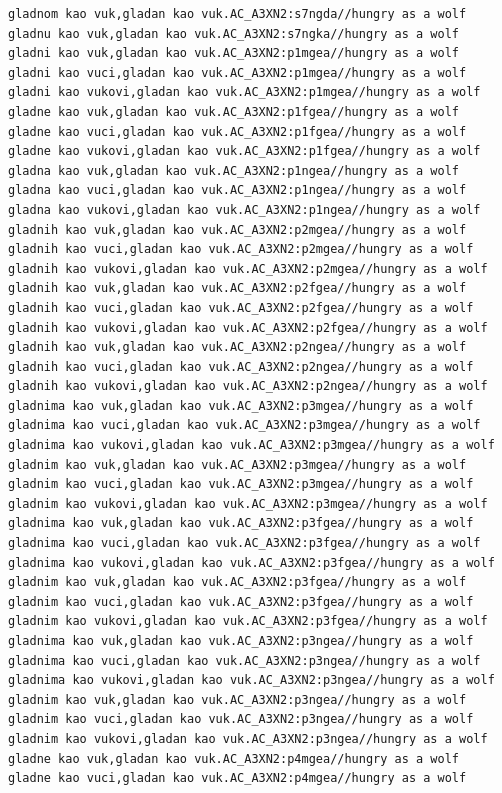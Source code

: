 \begin{verbatim}
gladnom kao vuk,gladan kao vuk.AC_A3XN2:s7ngda//hungry as a wolf
gladnu kao vuk,gladan kao vuk.AC_A3XN2:s7ngka//hungry as a wolf
gladni kao vuk,gladan kao vuk.AC_A3XN2:p1mgea//hungry as a wolf
gladni kao vuci,gladan kao vuk.AC_A3XN2:p1mgea//hungry as a wolf
gladni kao vukovi,gladan kao vuk.AC_A3XN2:p1mgea//hungry as a wolf
gladne kao vuk,gladan kao vuk.AC_A3XN2:p1fgea//hungry as a wolf
gladne kao vuci,gladan kao vuk.AC_A3XN2:p1fgea//hungry as a wolf
gladne kao vukovi,gladan kao vuk.AC_A3XN2:p1fgea//hungry as a wolf
gladna kao vuk,gladan kao vuk.AC_A3XN2:p1ngea//hungry as a wolf
gladna kao vuci,gladan kao vuk.AC_A3XN2:p1ngea//hungry as a wolf
gladna kao vukovi,gladan kao vuk.AC_A3XN2:p1ngea//hungry as a wolf
gladnih kao vuk,gladan kao vuk.AC_A3XN2:p2mgea//hungry as a wolf
gladnih kao vuci,gladan kao vuk.AC_A3XN2:p2mgea//hungry as a wolf
gladnih kao vukovi,gladan kao vuk.AC_A3XN2:p2mgea//hungry as a wolf
gladnih kao vuk,gladan kao vuk.AC_A3XN2:p2fgea//hungry as a wolf
gladnih kao vuci,gladan kao vuk.AC_A3XN2:p2fgea//hungry as a wolf
gladnih kao vukovi,gladan kao vuk.AC_A3XN2:p2fgea//hungry as a wolf
gladnih kao vuk,gladan kao vuk.AC_A3XN2:p2ngea//hungry as a wolf
gladnih kao vuci,gladan kao vuk.AC_A3XN2:p2ngea//hungry as a wolf
gladnih kao vukovi,gladan kao vuk.AC_A3XN2:p2ngea//hungry as a wolf
gladnima kao vuk,gladan kao vuk.AC_A3XN2:p3mgea//hungry as a wolf
gladnima kao vuci,gladan kao vuk.AC_A3XN2:p3mgea//hungry as a wolf
gladnima kao vukovi,gladan kao vuk.AC_A3XN2:p3mgea//hungry as a wolf
gladnim kao vuk,gladan kao vuk.AC_A3XN2:p3mgea//hungry as a wolf
gladnim kao vuci,gladan kao vuk.AC_A3XN2:p3mgea//hungry as a wolf
gladnim kao vukovi,gladan kao vuk.AC_A3XN2:p3mgea//hungry as a wolf
gladnima kao vuk,gladan kao vuk.AC_A3XN2:p3fgea//hungry as a wolf
gladnima kao vuci,gladan kao vuk.AC_A3XN2:p3fgea//hungry as a wolf
gladnima kao vukovi,gladan kao vuk.AC_A3XN2:p3fgea//hungry as a wolf
gladnim kao vuk,gladan kao vuk.AC_A3XN2:p3fgea//hungry as a wolf
gladnim kao vuci,gladan kao vuk.AC_A3XN2:p3fgea//hungry as a wolf
gladnim kao vukovi,gladan kao vuk.AC_A3XN2:p3fgea//hungry as a wolf
gladnima kao vuk,gladan kao vuk.AC_A3XN2:p3ngea//hungry as a wolf 
gladnima kao vuci,gladan kao vuk.AC_A3XN2:p3ngea//hungry as a wolf
gladnima kao vukovi,gladan kao vuk.AC_A3XN2:p3ngea//hungry as a wolf
gladnim kao vuk,gladan kao vuk.AC_A3XN2:p3ngea//hungry as a wolf
gladnim kao vuci,gladan kao vuk.AC_A3XN2:p3ngea//hungry as a wolf
gladnim kao vukovi,gladan kao vuk.AC_A3XN2:p3ngea//hungry as a wolf
gladne kao vuk,gladan kao vuk.AC_A3XN2:p4mgea//hungry as a wolf
gladne kao vuci,gladan kao vuk.AC_A3XN2:p4mgea//hungry as a wolf

\end{verbatim}
